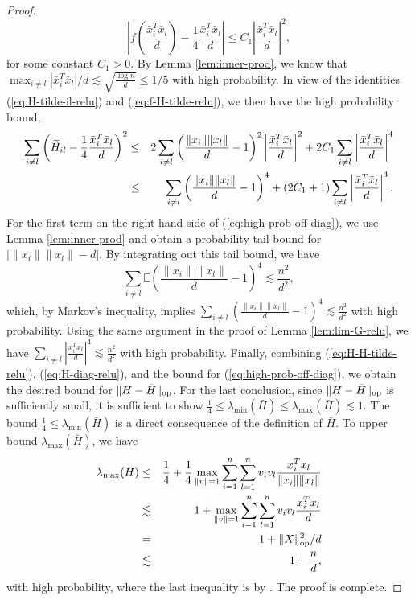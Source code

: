 \begin{proof}
$$\left|f\left(\frac{\bar{x}_i^T\bar{x}_l}{d}\right)-\frac{1}{4}\frac{\bar{x}_i^T\bar{x}_l}{d}\right|\leq C_1\left|\frac{\bar{x}_i^T\bar{x}_l}{d}\right|^2,$$
for some constant $C_1>0$. By Lemma \ref{lem:inner-prod}, we know that $\max_{i\neq l}|\bar{x}_i^T\bar{x}_l|/d\lesssim \sqrt{\frac{\log n}{d}}\leq 1/5$ with high probability. In view of the identities (\ref{eq:H-tilde-il-relu}) and (\ref{eq:f-H-tilde-relu}), we then have the high probability bound,
\begin{eqnarray}
\nonumber \sum_{i\neq l}\left(\wt{H}_{il}-\frac{1}{4}\frac{\bar{x}_i^T\bar{x}_l}{d}\right)^2 &\leq& 2\sum_{i\neq l}\left(\frac{\|x_i\|\|x_l\|}{d}-1\right)^2\left|\frac{\bar{x}_i^T\bar{x}_l}{d}\right|^2  + 2C_1\sum_{i\neq l}\left|\frac{\bar{x}_i^T\bar{x}_l}{d}\right|^4 \\
 \label{eq:high-prob-off-diag} &\leq& \sum_{i\neq l}\left(\frac{\|x_i\|\|x_l\|}{d}-1\right)^4 + (2C_1+1)\sum_{i\neq l}\left|\frac{\bar{x}_i^T\bar{x}_l}{d}\right|^4.
\end{eqnarray}
For the first term on the right hand side of (\ref{eq:high-prob-off-diag}), we use Lemma \ref{lem:inner-prod} and obtain a probability tail bound for $|\|x_i\|\|x_l\|-d|$. By integrating out this tail bound, we have
$$\sum_{i\neq l}\mathbb{E}\left(\frac{\|x_i\|\|x_l\|}{d}-1\right)^4\lesssim \frac{n^2}{d^2},$$
which, by Markov's inequality, implies $\sum_{i\neq l}\left(\frac{\|x_i\|\|x_l\|}{d}-1\right)^4\lesssim \frac{n^2}{d^2}$ with high probability.
Using the same argument in the proof of Lemma \ref{lem:lim-G-relu}, we have $\sum_{i\neq l}\left|\frac{x_i^Tx_l}{d}\right|^4\lesssim \frac{n^2}{d^2}$ with high probability.
Finally, combining (\ref{eq:H-H-tilde-relu}), (\ref{eq:H-diag-relu}), and the bound for (\ref{eq:high-prob-off-diag}), we obtain the desired bound for $\|H-\bar{H}\|_{\rm op}$.
For the last conclusion, since $\|H-\bar{H}\|_{\rm op}$ is sufficiently small, it is sufficient to show $\frac{1}{4}\leq\lambda_{\min}(\bar{H})\leq\lambda_{\max}(\bar{H})\lesssim 1$. The bound $\frac{1}{4}\leq\lambda_{\min}(\bar{H})$ is a direct consequence of the definition of $\bar{H}$. To upper bound $\lambda_{\max}(\bar{H})$, we have
\begin{eqnarray*}
\lambda_{\max}(\bar{H}) &\leq& \frac{1}{4} + \frac{1}{4}\max_{\|v\|=1}\sum_{i=1}^n\sum_{l=1}^nv_iv_l\frac{x_i^Tx_l}{\|x_i\|\|x_l\|} \\
&\lesssim& 1 + \max_{\|v\|=1}\sum_{i=1}^n\sum_{l=1}^nv_iv_l\frac{x_i^Tx_l}{d} \\
&=& 1 + \opnorm{X}^2/d \\
&\lesssim& 1 + \frac{n}{d},
\end{eqnarray*}
with high probability, where the last inequality is by \cite{davidson2001local}. The proof is complete.
\end{proof}


